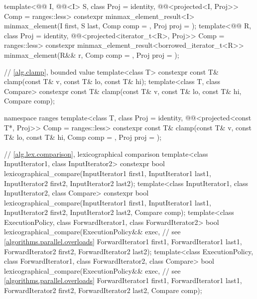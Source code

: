 \begin{codeblock}
{{    template<@@ I, @@<I> S, class Proj = identity,
             @@<projected<I, Proj>> Comp = ranges::less>
      constexpr minmax_element_result<I>
        minmax_element(I first, S last, Comp comp = {}, Proj proj = {});
    template<@@ R, class Proj = identity,
             @@<projected<iterator_t<R>, Proj>> Comp = ranges::less>
      constexpr minmax_element_result<borrowed_iterator_t<R>>
        minmax_element(R&& r, Comp comp = {}, Proj proj = {});
  }

  // \ref{alg.clamp}, bounded value
  template<class T>
    constexpr const T& clamp(const T& v, const T& lo, const T& hi);
  template<class T, class Compare>
    constexpr const T& clamp(const T& v, const T& lo, const T& hi, Compare comp);

  namespace ranges {
    template<class T, class Proj = identity,
             @@<projected<const T*, Proj>> Comp = ranges::less>
      constexpr const T&
        clamp(const T& v, const T& lo, const T& hi, Comp comp = {}, Proj proj = {});
  }

  // \ref{alg.lex.comparison}, lexicographical comparison
  template<class InputIterator1, class InputIterator2>
    constexpr bool
      lexicographical_compare(InputIterator1 first1, InputIterator1 last1,
                              InputIterator2 first2, InputIterator2 last2);
  template<class InputIterator1, class InputIterator2, class Compare>
    constexpr bool
      lexicographical_compare(InputIterator1 first1, InputIterator1 last1,
                              InputIterator2 first2, InputIterator2 last2,
                              Compare comp);
  template<class ExecutionPolicy, class ForwardIterator1, class ForwardIterator2>
    bool
      lexicographical_compare(ExecutionPolicy&& exec,           // see \ref{algorithms.parallel.overloads}
                              ForwardIterator1 first1, ForwardIterator1 last1,
                              ForwardIterator2 first2, ForwardIterator2 last2);
  template<class ExecutionPolicy, class ForwardIterator1, class ForwardIterator2,
           class Compare>
    bool
      lexicographical_compare(ExecutionPolicy&& exec,           // see \ref{algorithms.parallel.overloads}
                              ForwardIterator1 first1, ForwardIterator1 last1,
                              ForwardIterator2 first2, ForwardIterator2 last2,
                              Compare comp);

}
\end{codeblock}
